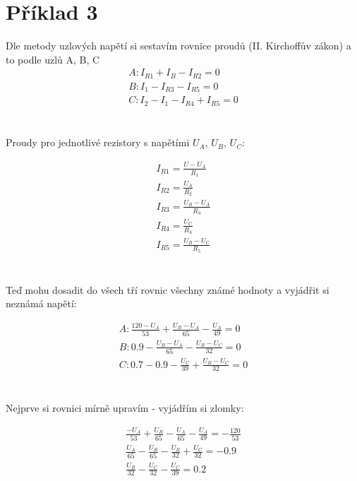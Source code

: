 \section{Příklad 3}
Dle metody uzlových napětí si sestavím rovnice proudů (II. Kirchoffův zákon) a to podle uzlů A, B, C 
\begin{gather*}
A: I_{R1} + I_B - I_{R2} = 0\\
B: I_1 - I_{R3} - I_{R5} = 0\\
C: I_2 - I_1 - I_{R4} + I_{R5} = 0\\
\end{gather*}
\\
\begin{center}
Proudy pro jednotlivé rezistory s napětími $U_A$, $U_B$, $U_C$:
\end{center}
\begin{gather*}
I_{R1} =\frac{U - U_A}{R_1}\\
I_{R2} =\frac{U_A}{R_2}\\
I_{R3} =\frac{U_B - U_A}{R_3}\\
I_{R4} =\frac{U_C}{R_4}\\
I_{R5} =\frac{U_B - U_C}{R_5}\\
\end{gather*}
\\
\newpage
\begin{center}
Teď mohu dosadit do všech tří rovnic všechny známé hodnoty a vyjádřit si neznámá napětí:
\end{center}
\begin{gather*}
A: \frac{120 - U_A}{53} + \frac{U_B - U_A}{65} - \frac{U_A}{49} = 0\\
B: 0.9 - \frac{U_B - U_A}{65} - \frac{U_B - U_C}{32} = 0\\
C: 0.7 - 0.9 - \frac{U_C}{39} + \frac{U_B - U_C}{32} = 0\\
\end{gather*}
\\
\begin{center}
Nejprve si rovnici mírně upravím - vyjádřím si zlomky:
\end{center}
\begin{gather*}
\frac{-U_A}{53} + \frac{U_B}{65} - \frac{U_A}{65} - \frac{U_A}{49} = -\frac{120}{53}\\
\frac{U_A}{65} - \frac{U_B}{65} - \frac{U_B}{32} + \frac{U_C}{32} = -0.9\\
\frac{U_B}{32} - \frac{U_C}{32} - \frac{U_C}{39} = 0.2\\
\end{gather*}
